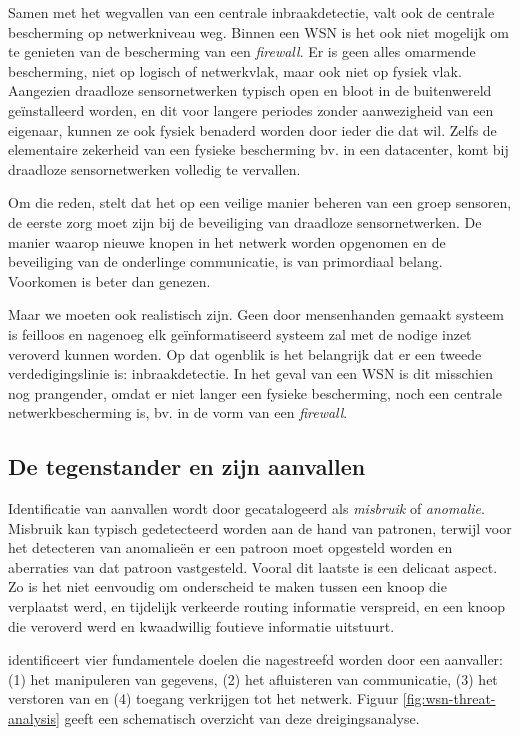 Samen met het wegvallen van een centrale inbraakdetectie, valt ook de centrale
bescherming op netwerkniveau weg. Binnen een WSN is het ook niet mogelijk om te
genieten van de bescherming van een \emph{firewall}. Er is geen alles omarmende
bescherming, niet op logisch of netwerkvlak, maar ook niet op fysiek vlak.
Aangezien draadloze sensornetwerken typisch open en bloot in de buitenwereld
ge\"installeerd worden, en dit voor langere periodes zonder aanwezigheid van
een eigenaar, kunnen ze ook fysiek benaderd worden door ieder die dat wil.
Zelfs de elementaire zekerheid van een fysieke bescherming bv. in een
datacenter, komt bij draadloze sensornetwerken volledig te vervallen.

Om die reden, stelt \citep{perrig2004security} dat het op een veilige manier
beheren van een groep sensoren, de eerste zorg moet zijn bij de beveiliging van
draadloze sensornetwerken. De manier waarop nieuwe knopen in het netwerk worden
opgenomen en de beveiliging van de onderlinge communicatie, is van primordiaal
belang. Voorkomen is beter dan genezen.

Maar we moeten ook realistisch zijn. Geen door mensenhanden gemaakt systeem is
feilloos en nagenoeg elk ge\"informatiseerd systeem zal met de nodige inzet
veroverd kunnen worden. Op dat ogenblik is het belangrijk dat er een tweede
verdedigingslinie is: inbraakdetectie. In het geval van een WSN is dit
misschien nog prangender, omdat er niet langer een fysieke bescherming, noch
een centrale netwerkbescherming is, bv. in de vorm van een \emph{firewall}.

\subsection{De tegenstander en zijn aanvallen}

Identificatie van aanvallen wordt door \citep{zhang2000intrusion} gecatalogeerd
als \emph{misbruik} of \emph{anomalie}. Misbruik kan typisch gedetecteerd
worden aan de hand van patronen, terwijl voor het detecteren van anomalie\"en
er een patroon moet opgesteld worden en aberraties van dat patroon vastgesteld.
Vooral dit laatste is een delicaat aspect. Zo is het niet eenvoudig om
onderscheid te maken tussen een knoop die verplaatst werd, en tijdelijk
verkeerde routing informatie verspreid, en een knoop die veroverd werd en
kwaadwillig foutieve informatie uitstuurt.

\citep{aschenbruck2012security} identificeert vier fundamentele doelen die
nagestreefd worden door een aanvaller: (1) het manipuleren van gegevens, (2)
het afluisteren van communicatie, (3) het verstoren van en (4) toegang
verkrijgen tot het netwerk. Figuur \ref{fig:wsn-threat-analysis} geeft een
schematisch overzicht van deze dreigingsanalyse.

